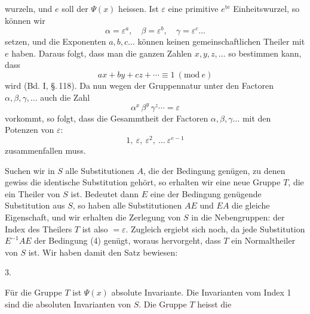 wurzeln, und $e$ soll der  $\mathit\Psi(x)$ heissen.
Ist $\varepsilon$ eine primitive $e^{\mathrm{te}}$ Einheitswurzel, so können wir
\[
\alpha=\varepsilon^a,\quad \beta=\varepsilon^b,\quad \gamma=\varepsilon^c \ldots
\]
setzen, und die Exponenten $a,b,c\ldots$ können keinen gemeinschaftlichen
 Theiler mit $e$ haben. Daraus folgt, dass man die
ganzen Zahlen $x,y,z,\ldots$ so bestimmen kann, dass
\[
ax+by+cz+\cdots \equiv 1\ (\mathrm{mod}\ e)
\]
wird (Bd. I, \S.\,118). Da nun wegen der Gruppennatur unter
den Factoren $\alpha,\beta,\gamma,\ldots$ auch die Zahl
\[
\alpha^x\,\beta^y\,\gamma^z \cdots = \varepsilon
\]
vorkommt, so folgt, dass die Gesammtheit der Factoren $\alpha,\beta,\gamma\ldots$
mit den Potenzen von $\varepsilon$:
\[
1,\ \varepsilon,\ \varepsilon^2,\ \ldots\ \varepsilon^{e-1}
\]
zusammenfallen muss.

Suchen wir in $S$ alle Substitutionen $A$, die der Bedingung
genügen, zu denen gewiss die identische Substitution gehört, so
erhalten wir eine neue Gruppe $T$, die ein Theiler von $S$ ist.
Bedeutet dann $E$ eine der Bedingung
genügende Substitution aus $S$, so haben alle Substitutionen $AE$
und $EA$ die gleiche Eigenschaft, und wir erhalten die Zerlegung
von $S$ in die Nebengruppen:
der Index des Theilers $T$ ist also $=\varepsilon$. %
Zugleich ergiebt sich
noch, da jede Substitution $E^{-1}AE$ der Bedingung (4) genügt,
woraus hervorgeht, dass $T$ ein Normaltheiler von $S$ ist. Wir
haben damit den Satz bewiesen:

3. 

Für die Gruppe $T$ ist $\mathit\Psi(x)$ absolute Invariante. Die Invarianten
 vom Index 1 sind die absoluten Invarianten von $S$.
Die Gruppe $T$ heisst die 
